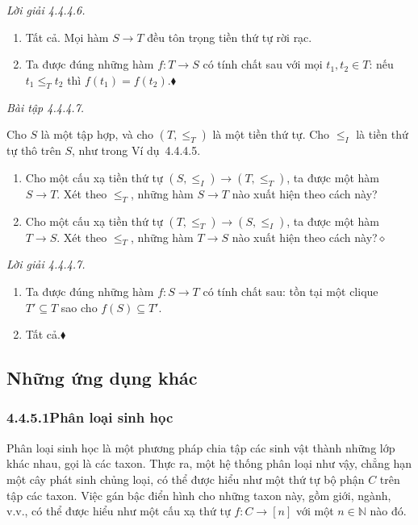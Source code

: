 \noindent\textit{Lời giải 4.4.4.6.}\keepwithnext
\begin{enumerate}[label=\alph*.]
\item Tất cả. Mọi hàm $S\to T$ đều tôn trọng tiền thứ tự rời rạc.
\item Ta được đúng những hàm $f:T\to S$ có tính chất sau với mọi $t_1,t_2\in T$: nếu $t_1\le_Tt_2$ thì $f(t_1)=f(t_2)$.\nobreak\hfill$\blacklozenge$
\end{enumerate}

\noindent\textit{Bài tập 4.4.4.7.}\keepwithnext

Cho $S$ là một tập hợp, và cho $(T,\le_T)$ là một tiền thứ tự. Cho $\le_I$ là tiền thứ tự thô trên $S$, như trong Ví dụ~4.4.4.5.
\begin{enumerate}[label=\alph*.]
\item Cho một cấu xạ tiền thứ tự $(S,\le_I)\to(T,\le_T)$, ta được một hàm $S\to T$. Xét theo $\le_T$, những hàm $S\to T$ nào xuất hiện theo cách này?
\item Cho một cấu xạ tiền thứ tự $(T,\le_T)\to(S,\le_I)$, ta được một hàm $T\to S$. Xét theo $\le_T$, những hàm $T\to S$ nào xuất hiện theo cách này?\hfill$\diamond$
\end{enumerate}

\noindent\textit{Lời giải 4.4.4.7.}\keepwithnext
\begin{enumerate}[label=\alph*.]
\item Ta được đúng những hàm $f:S\to T$ có tính chất sau: tồn tại một clique $T'\subseteq T$ sao cho $f(S)\subseteq T'$.
\item Tất cả.\nobreak\hfill$\blacklozenge$
\end{enumerate}

\subsection{Những ứng dụng khác}
\subsubsection*{4.4.5.1\quad Phân loại sinh học}

Phân loại sinh học là một phương pháp chia tập các sinh vật thành những lớp khác nhau, gọi là các taxon. Thực ra, một hệ thống phân loại như vậy, chẳng hạn một cây phát sinh chủng loại, có thể được hiểu như một thứ tự bộ phận $C$ trên tập các taxon. Việc gán bậc điển hình cho những taxon này, gồm giới, ngành, v.v., có thể được hiểu như một cấu xạ thứ tự $f:C\to[n]$ với một $n\in\mathbb{N}$ nào đó.

